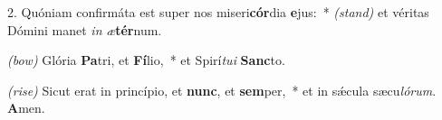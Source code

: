 2. Quóniam confirmáta est super nos miseri\textbf{cór}dia \textbf{e}jus:~* {\color{red}\textit{(stand)}} et véritas Dómini manet \textit{in} \textit{æ}\textbf{tér}num.

{\color{red}\textit{(bow)}} Glória \textbf{Pa}tri, et \textbf{Fí}lio,~* et Spirí\textit{tu}\textit{i} \textbf{Sanc}to.

{\color{red}\textit{(rise)}} Sicut erat in princípio, et \textbf{nunc}, et \textbf{sem}per,~* et in sǽcula sæcu\textit{ló}\textit{rum}. \textbf{A}men.